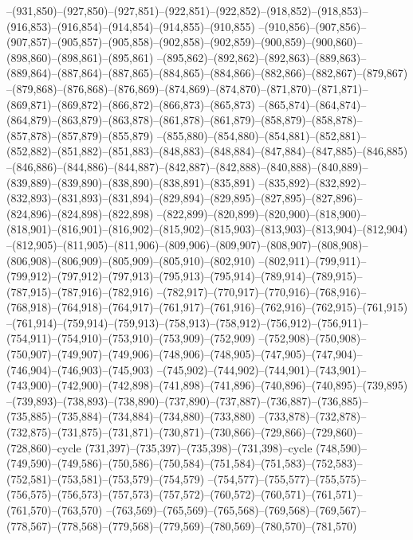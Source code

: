 --(931,850)--(927,850)--(927,851)--(922,851)--(922,852)--(918,852)--(918,853)--(916,853)--(916,854)--(914,854)--(914,855)--(910,855)
--(910,856)--(907,856)--(907,857)--(905,857)--(905,858)--(902,858)--(902,859)--(900,859)--(900,860)--(898,860)--(898,861)--(895,861)
--(895,862)--(892,862)--(892,863)--(889,863)--(889,864)--(887,864)--(887,865)--(884,865)--(884,866)--(882,866)--(882,867)--(879,867)
--(879,868)--(876,868)--(876,869)--(874,869)--(874,870)--(871,870)--(871,871)--(869,871)--(869,872)--(866,872)--(866,873)--(865,873)
--(865,874)--(864,874)--(864,879)--(863,879)--(863,878)--(861,878)--(861,879)--(858,879)--(858,878)--(857,878)--(857,879)--(855,879)
--(855,880)--(854,880)--(854,881)--(852,881)--(852,882)--(851,882)--(851,883)--(848,883)--(848,884)--(847,884)--(847,885)--(846,885)
--(846,886)--(844,886)--(844,887)--(842,887)--(842,888)--(840,888)--(840,889)--(839,889)--(839,890)--(838,890)--(838,891)--(835,891)
--(835,892)--(832,892)--(832,893)--(831,893)--(831,894)--(829,894)--(829,895)--(827,895)--(827,896)--(824,896)--(824,898)--(822,898)
--(822,899)--(820,899)--(820,900)--(818,900)--(818,901)--(816,901)--(816,902)--(815,902)--(815,903)--(813,903)--(813,904)--(812,904)
--(812,905)--(811,905)--(811,906)--(809,906)--(809,907)--(808,907)--(808,908)--(806,908)--(806,909)--(805,909)--(805,910)--(802,910)
--(802,911)--(799,911)--(799,912)--(797,912)--(797,913)--(795,913)--(795,914)--(789,914)--(789,915)--(787,915)--(787,916)--(782,916)
--(782,917)--(770,917)--(770,916)--(768,916)--(768,918)--(764,918)--(764,917)--(761,917)--(761,916)--(762,916)--(762,915)--(761,915)
--(761,914)--(759,914)--(759,913)--(758,913)--(758,912)--(756,912)--(756,911)--(754,911)--(754,910)--(753,910)--(753,909)--(752,909)
--(752,908)--(750,908)--(750,907)--(749,907)--(749,906)--(748,906)--(748,905)--(747,905)--(747,904)--(746,904)--(746,903)--(745,903)
--(745,902)--(744,902)--(744,901)--(743,901)--(743,900)--(742,900)--(742,898)--(741,898)--(741,896)--(740,896)--(740,895)--(739,895)
--(739,893)--(738,893)--(738,890)--(737,890)--(737,887)--(736,887)--(736,885)--(735,885)--(735,884)--(734,884)--(734,880)--(733,880)
--(733,878)--(732,878)--(732,875)--(731,875)--(731,871)--(730,871)--(730,866)--(729,866)--(729,860)--(728,860)--cycle
(731,397)--(735,397)--(735,398)--(731,398)--cycle
(748,590)--(749,590)--(749,586)--(750,586)--(750,584)--(751,584)--(751,583)--(752,583)--(752,581)--(753,581)--(753,579)--(754,579)
--(754,577)--(755,577)--(755,575)--(756,575)--(756,573)--(757,573)--(757,572)--(760,572)--(760,571)--(761,571)--(761,570)--(763,570)
--(763,569)--(765,569)--(765,568)--(769,568)--(769,567)--(778,567)--(778,568)--(779,568)--(779,569)--(780,569)--(780,570)--(781,570)
